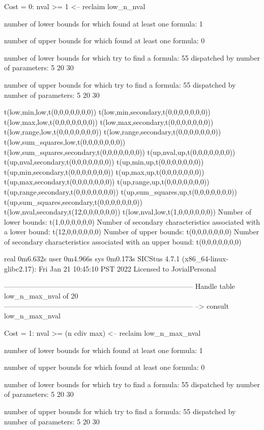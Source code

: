 Cost =  0:  nval >= 1
<-- reclaim low_n_nval

number of lower bounds for which found at least one formula: 1

number of upper bounds for which found at least one formula: 0

number of lower bounds for which try to find a formula: 55
dispatched by number of parameters: 5  20  30

number of upper bounds for which try to find a formula: 55
dispatched by number of parameters: 5  20  30

t(low,min,low,t(0,0,0,0,0,0,0))
t(low,min,secondary,t(0,0,0,0,0,0,0))
t(low,max,low,t(0,0,0,0,0,0,0))
t(low,max,secondary,t(0,0,0,0,0,0,0))
t(low,range,low,t(0,0,0,0,0,0,0))
t(low,range,secondary,t(0,0,0,0,0,0,0))
t(low,sum_squares,low,t(0,0,0,0,0,0,0))
t(low,sum_squares,secondary,t(0,0,0,0,0,0,0))
t(up,nval,up,t(0,0,0,0,0,0,0))
t(up,nval,secondary,t(0,0,0,0,0,0,0))
t(up,min,up,t(0,0,0,0,0,0,0))
t(up,min,secondary,t(0,0,0,0,0,0,0))
t(up,max,up,t(0,0,0,0,0,0,0))
t(up,max,secondary,t(0,0,0,0,0,0,0))
t(up,range,up,t(0,0,0,0,0,0,0))
t(up,range,secondary,t(0,0,0,0,0,0,0))
t(up,sum_squares,up,t(0,0,0,0,0,0,0))
t(up,sum_squares,secondary,t(0,0,0,0,0,0,0))
t(low,nval,secondary,t(12,0,0,0,0,0,0))
t(low,nval,low,t(1,0,0,0,0,0,0))
Number of lower bounds:                                             t(1,0,0,0,0,0,0)
Number of secondary characteristics associated with a lower bound:  t(12,0,0,0,0,0,0)
Number of upper bounds:                                             t(0,0,0,0,0,0,0)
Number of secondary characteristics associated with an upper bound: t(0,0,0,0,0,0,0)

real	0m6.632s
user	0m4.966s
sys	0m0.173s
SICStus 4.7.1 (x86_64-linux-glibc2.17): Fri Jan 21 10:45:10 PST 2022
Licensed to JovialPersonal


--------------------------------------------------------------------------------
Handle table low_n_max_nval of 20
--------------------------------------------------------------------------------
--> consult low_n_max_nval

Cost =  1:  nval >= (n cdiv max)
<-- reclaim low_n_max_nval

number of lower bounds for which found at least one formula: 1

number of upper bounds for which found at least one formula: 0

number of lower bounds for which try to find a formula: 55
dispatched by number of parameters: 5  20  30

number of upper bounds for which try to find a formula: 55
dispatched by number of parameters: 5  20  30

